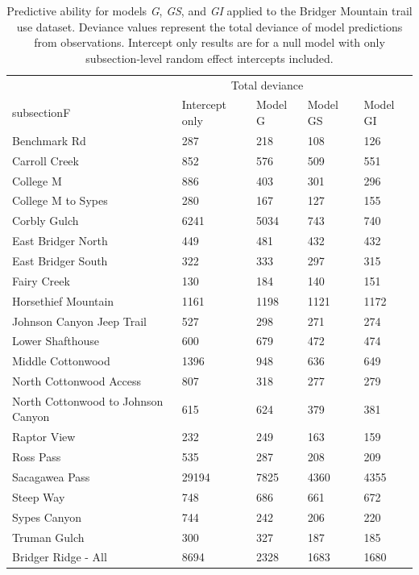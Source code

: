 \documentclass[
]{book}
\begin{document}
\begin{table}

\caption{\label{tab:deviance-kable}Predictive ability for models \emph{G}, \emph{GS}, and \emph{GI} applied to the Bridger Mountain trail use dataset. Deviance values represent the total deviance of model predictions from observations. Intercept only results are for a null model with only subsection-level random effect intercepts included.}
\centering
\begin{tabular}[t]{lllll}
\toprule
\multicolumn{1}{c}{ } & \multicolumn{3}{c}{Total deviance} \\
\cmidrule(l{3pt}r{3pt}){2-4}
subsectionF & Intercept only & Model G & Model GS & Model GI\\
\midrule
Benchmark Rd & 287 & 218 & 108 & 126\\
Carroll Creek & 852 & 576 & 509 & 551\\
College M & 886 & 403 & 301 & 296\\
College M to Sypes & 280 & 167 & 127 & 155\\
Corbly Gulch & 6241 & 5034 & 743 & 740\\
\addlinespace
East Bridger North & 449 & 481 & 432 & 432\\
East Bridger South & 322 & 333 & 297 & 315\\
Fairy Creek & 130 & 184 & 140 & 151\\
Horsethief Mountain & 1161 & 1198 & 1121 & 1172\\
Johnson Canyon Jeep Trail & 527 & 298 & 271 & 274\\
\addlinespace
Lower Shafthouse & 600 & 679 & 472 & 474\\
Middle Cottonwood & 1396 & 948 & 636 & 649\\
North Cottonwood Access & 807 & 318 & 277 & 279\\
North Cottonwood to Johnson Canyon & 615 & 624 & 379 & 381\\
Raptor View & 232 & 249 & 163 & 159\\
\addlinespace
Ross Pass & 535 & 287 & 208 & 209\\
Sacagawea Pass & 29194 & 7825 & 4360 & 4355\\
Steep Way & 748 & 686 & 661 & 672\\
Sypes Canyon & 744 & 242 & 206 & 220\\
Truman Gulch & 300 & 327 & 187 & 185\\
\addlinespace
Bridger Ridge - All & 8694 & 2328 & 1683 & 1680\\
\bottomrule
\end{tabular}
\end{table}
\end{document}
